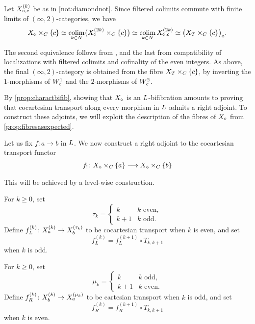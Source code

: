 \documentclass[a4paper,reqno,twoside]{amsart}
\begin{document}
\begin{remark}\label{prop:fibresasexpected}
	 Let $\relax{X}^{(k)}_{\diamond,c}$ be as in \cref{not:diamondnot}. Since filtered colimits commute with finite limits of $(\infty,2)$-categories, we have
	\[
		\relax{X}_{\diamond}\times_{\relax{C}}\{c\} \simeq \operatorname*{colim}_{k\in\relax N}\bigl(\relax{X}_{\diamond}^{(2k)}\times_{\relax{C}}\{c\}\bigr)\simeq \operatorname*{colim}_{k\in\relax N}\relax{X}^{(2k)}_{\diamond,c} \simeq \bigl(\relax{X}_{T}\times_{\relax{C}}\{c\}\bigr)_{\diamond}.
	\]

	The second equivalence follows from \cite[Theorem 4.7.1]{AHM26}, and the last from compatibility of localizations with filtered colimits and cofinality of the even integers. As above, the final $(\infty,2)$-category is obtained from the fibre $\relax{X}_{T}\times_{\relax{C}}\{c\}$, by inverting the $1$-morphisms of $\relax{W}_c^1$ and the $2$-morphisms of $\relax{W}_c^2$.
\end{remark}

By \cref{prop:charactbifib}, showing that $\relax{X}_\diamond$ is an $\relax{L}$-bifibration amounts to proving that cocartesian transport along every morphism in $\relax{L}$ admits a right adjoint. To construct these adjoints, we will exploit the description of the fibres of $\relax{X}_{\diamond}$ from \cref{prop:fibresasexpected}.

Let us fix $f\colon a\to b$ in $\relax{L}$. We now construct a right adjoint to the cocartesian transport functor
\begin{equation}\label{eq:transp}
	f_!\colon\relax{X}_{\diamond}\times_{\relax{C}}\{a\}\longrightarrow\relax{X}_{\diamond}\times_{\relax{C}}\{b\}
\end{equation}

This will be achieved by a level-wise construction.

\begin{construction}\label{cons:pushL}
	For $k\geq0$, set
	\[
		\tau_k=
		\begin{cases}
			k & k\text{ even},\\
			k+1 & k\text{ odd}.
		\end{cases}
	\]
	Define $f_L^{(k)}\colon\relax{X}_a^{(k)}\to\relax{X}_b^{(\tau_k)}$ to be cocartesian transport when $k$ is even, and set
	\[
		f_L^{(k)}=f_L^{(k+1)}\circ T_{k,k+1}
	\]
	when $k$ is odd.
\end{construction}

\begin{definition}\label{def:cartpush}
	For $k\geq0$, set
	\[
		\mu_k=
		\begin{cases}
			k & k\text{ odd},\\
			k+1 & k\text{ even}.
		\end{cases}
	\]
	Define $f_R^{(k)}\colon\relax{X}_b^{(k)}\to\relax{X}_a^{(\mu_k)}$ to be cartesian transport when $k$ is odd, and set
	\[
		f_R^{(k)}=f_R^{(k+1)}\circ T_{k,k+1}
	\]
	when $k$ is even.
\end{definition}
\end{document}
